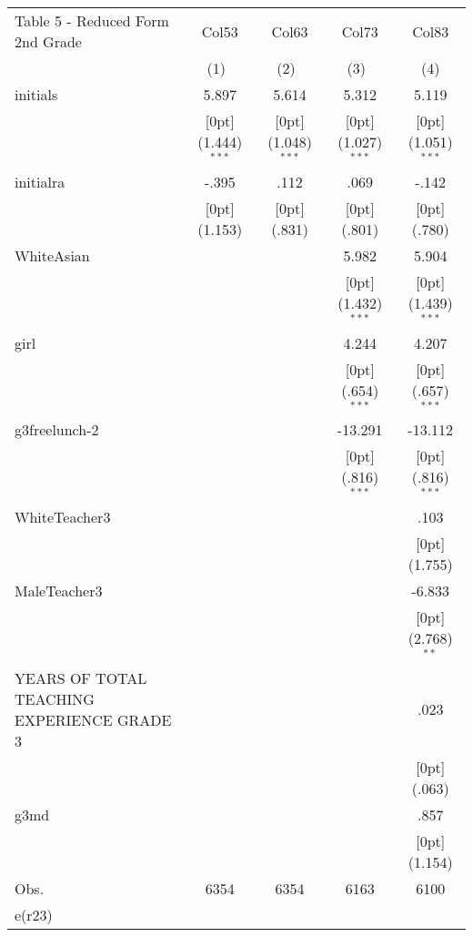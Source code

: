 \documentclass[a4paper,11pt]{article}
\begin{document}
	
\begin{table}
	\small
\begin{tabular*}{\textwidth}{@{\extracolsep{\fill}}lcccc}				
	Table 5 - Reduced Form 2nd Grade	& \multicolumn{1}{c}{Col53} &	\multicolumn{1}{c}{Col63} &	\multicolumn{1}{c}{Col73} &	\multicolumn{1}{c}{Col83} \\
	\cline{2-5}				
	& \multicolumn{1}{c}{(1)\mbox{\ }} &	\multicolumn{1}{c}{(2)\mbox{\ }} &	\multicolumn{1}{c}{(3)\mbox{\ }} &	\multicolumn{1}{c}{(4)} \\
	\hline				
	initials &	5.897 &	5.614 &	5.312 &	5.119 \\
	&	\raisebox{.7ex}[0pt]{\scriptsize (1.444)$^{***}$} &	\raisebox{.7ex}[0pt]{\scriptsize (1.048)$^{***}$} &	\raisebox{.7ex}[0pt]{\scriptsize (1.027)$^{***}$} &	\raisebox{.7ex}[0pt]{\scriptsize (1.051)$^{***}$} \\
	initialra &	-.395 &	.112 &	.069 &	-.142 \\
	&	\raisebox{.7ex}[0pt]{\scriptsize (1.153)} &	\raisebox{.7ex}[0pt]{\scriptsize (.831)} &	\raisebox{.7ex}[0pt]{\scriptsize (.801)} &	\raisebox{.7ex}[0pt]{\scriptsize (.780)} \\
	WhiteAsian &	&	&	5.982 &	5.904 \\
	&	&	&	\raisebox{.7ex}[0pt]{\scriptsize (1.432)$^{***}$} &	\raisebox{.7ex}[0pt]{\scriptsize (1.439)$^{***}$} \\
	girl &	&	&	4.244 &	4.207 \\
	&	&	&	\raisebox{.7ex}[0pt]{\scriptsize (.654)$^{***}$} &	\raisebox{.7ex}[0pt]{\scriptsize (.657)$^{***}$} \\
	g3freelunch-2 &	&	&	-13.291 &	-13.112 \\
	&	&	&	\raisebox{.7ex}[0pt]{\scriptsize (.816)$^{***}$} &	\raisebox{.7ex}[0pt]{\scriptsize (.816)$^{***}$} \\
	WhiteTeacher3 &	&	&	&	.103 \\
	&	&	&	&	\raisebox{.7ex}[0pt]{\scriptsize (1.755)} \\
	MaleTeacher3 &	&	&	&	-6.833 \\
	&	&	&	&	\raisebox{.7ex}[0pt]{\scriptsize (2.768)$^{**}$} \\
	YEARS OF TOTAL TEACHING EXPERIENCE GRADE 3 &	&	&	&	.023 \\
	&	&	&	&	\raisebox{.7ex}[0pt]{\scriptsize (.063)} \\
	g3md &	&	&	&	.857 \\
	&	&	&	&	\raisebox{.7ex}[0pt]{\scriptsize (1.154)} \\
	Obs. &	6354 &	6354 &	6163 &	6100 \\
	e(r23) &	&	&	&	\\
	\hline\hline			
\end{tabular*}	
\end{table}	
\end{document}
